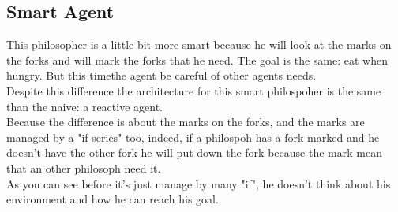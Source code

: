 \subsection{Smart Agent}
This philosopher is a little bit more smart because he will look at the marks on the forks and will mark the forks that he need. The goal is the same: eat when hungry. But this timethe agent be careful of other agents needs.\\
Despite this difference the architecture for this smart philospoher is the same than the naive: a reactive agent.\\
Because the difference is about the marks on the forks, and the marks are managed by a "if series" too, indeed, if a philospoh has a fork marked and he doesn't have the other fork he will put down the fork because the mark mean that an other philosoph need it.\\
As you can see before it's just manage by many "if", he doesn't think about his environment and how he can reach his goal.
